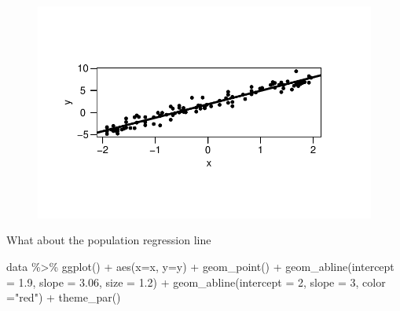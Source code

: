 \documentclass[
  letterpaper,
  DIV=11,
  numbers=noendperiod]{scrreprt}
\newenvironment{Shaded}{\begin{snugshade}}{\end{snugshade}}
\newcommand{\AttributeTok}[1]{\textcolor[rgb]{0.65,0.35,0.00}{#1}}
\newcommand{\DecValTok}[1]{\textcolor[rgb]{0.47,0.16,0.63}{#1}}
\newcommand{\FloatTok}[1]{\textcolor[rgb]{0.65,0.35,0.00}{#1}}
\newcommand{\FunctionTok}[1]{\textcolor[rgb]{0.02,0.16,0.49}{#1}}
\newcommand{\NormalTok}[1]{\textcolor[rgb]{0.33,0.33,0.33}{#1}}
\newcommand{\SpecialCharTok}[1]{\textcolor[rgb]{0.00,0.46,0.62}{#1}}
\newcommand{\StringTok}[1]{\textcolor[rgb]{0.00,0.50,0.00}{#1}}
\begin{document}
\begin{figure}[H]

{\centering \includegraphics{Chapter3_files/figure-pdf/unnamed-chunk-15-1.pdf}

}

\end{figure}

What about the population regression line

\begin{Shaded}
\begin{Highlighting}[]
\NormalTok{data }\SpecialCharTok{\%\textgreater{}\%} 
  \FunctionTok{ggplot}\NormalTok{() }\SpecialCharTok{+} \FunctionTok{aes}\NormalTok{(}\AttributeTok{x=}\NormalTok{x, }\AttributeTok{y=}\NormalTok{y) }\SpecialCharTok{+} \FunctionTok{geom\_point}\NormalTok{() }\SpecialCharTok{+} \FunctionTok{geom\_abline}\NormalTok{(}\AttributeTok{intercept =} \FloatTok{1.9}\NormalTok{, }\AttributeTok{slope =} \FloatTok{3.06}\NormalTok{, }\AttributeTok{size =} \FloatTok{1.2}\NormalTok{) }\SpecialCharTok{+} \FunctionTok{geom\_abline}\NormalTok{(}\AttributeTok{intercept =} \DecValTok{2}\NormalTok{, }\AttributeTok{slope =} \DecValTok{3}\NormalTok{, }\AttributeTok{color =}\StringTok{"red"}\NormalTok{) }\SpecialCharTok{+} \FunctionTok{theme\_par}\NormalTok{()}
\end{Highlighting}
\end{Shaded}
\end{document}
